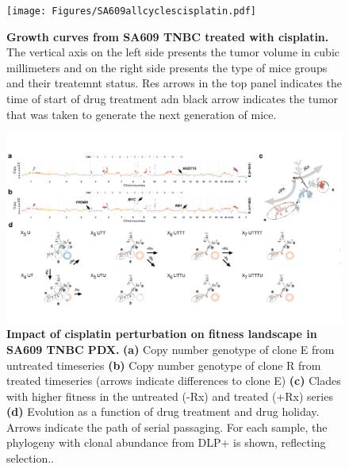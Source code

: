 

\begin{figure}
\centering
\texttt{[image: Figures/SA609allcyclescisplatin.pdf]}
	
\caption[Representative growth curves from SA609 TNBC treated with cisplatin]
	{\small
	\textbf{Growth curves from SA609 TNBC treated with cisplatin.}
	   The vertical axis on the left side presents the tumor volume in cubic millimeters and on the right side presents the type of mice groups and their treatemnt status. Res arrows in the top panel indicates the time of start of drug treatment adn black arrow indicates the tumor that was taken to generate the next generation of mice.
	}
	\label{fig:Untreated timeseries growth curves only}
\end{figure}




\begin{figure}
\centering
\includegraphics[width=\textwidth]{Figures/drugholidayfitnesscost.pdf}
	
\caption[Impact of cisplatin perturbation on fitness landscape in  SA609 TNBC PDX.]
	{\small
	\textbf{Impact of cisplatin perturbation on fitness landscape in  SA609 TNBC PDX.}
	  \textbf{(a)} Copy number genotype of clone E from untreated timeseries \textbf{(b)} Copy number genotype of clone R from treated timeseries (arrows indicate differences to clone E) \textbf{(c)} Clades with higher fitness in the untreated (-Rx) and treated (+Rx) series \textbf{(d)} Evolution as a function of drug treatment and drug holiday. Arrows indicate the path of serial passaging. For each sample, the phylogeny with clonal abundance from DLP+ is shown, reflecting selection..
	}
	\label{fig:Untreated timeseries growth curves only}
\end{figure}

